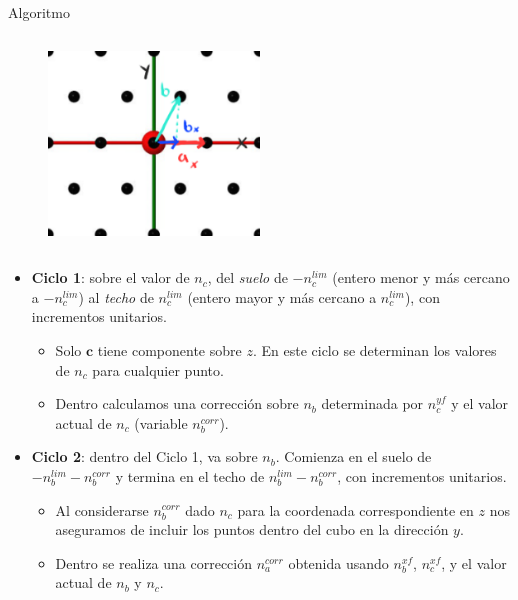 \documentclass[dvisvgm,11pt,aspectratio=169]{beamer}
\begin{document}
\begin{frame}{Algoritmo}
\begin{columns}
\begin{column}{0.39\textwidth}
\begin{figure}
\end{figure}
\vspace{-0.5cm}
\begin{figure}
\includegraphics[width=0.5\textwidth]{img/gridProj}
\end{figure}
\end{column}
\end{columns}

\end{frame}

\begin{frame} 
\begin{itemize}
\item \textbf{Ciclo 1}: sobre el valor de $n_c$, del \textit{suelo} de $-n_c^{lim}$ (entero menor y más cercano a $-n_c^{lim}$) al \textit{techo} de $n_c^{lim}$ (entero mayor y más cercano a $n_c^{lim}$), con incrementos unitarios. 
\begin{itemize}
\item Solo $\mathbf{c}$ tiene componente sobre $z$. En este ciclo se determinan los valores de $n_c$ para cualquier punto.
\item Dentro calculamos una corrección sobre $n_b$ determinada por $n_c^{yf}$ y el valor actual de $n_c$ (variable $n_b^{corr}$).
\end{itemize}
\item \textbf{Ciclo 2}: dentro del Ciclo 1, va sobre $n_b$. Comienza en el suelo de $-n_b^{lim}-n_b^{corr}$ y termina en el techo de $n_b^{lim}-n_b^{corr}$, con incrementos unitarios. 
\begin{itemize}
\item Al considerarse $n_b^{corr}$ dado $n_c$ para la coordenada correspondiente en $z$ nos aseguramos de incluir los puntos dentro del cubo en la dirección $y$.
\item Dentro se realiza una corrección $n_a^{corr}$ obtenida usando $n_b^{xf}$, $n_c^{xf}$, y el valor actual de $n_b$ y $n_c$.
\end{itemize}
\end{itemize}
\end{frame}
\end{document}
